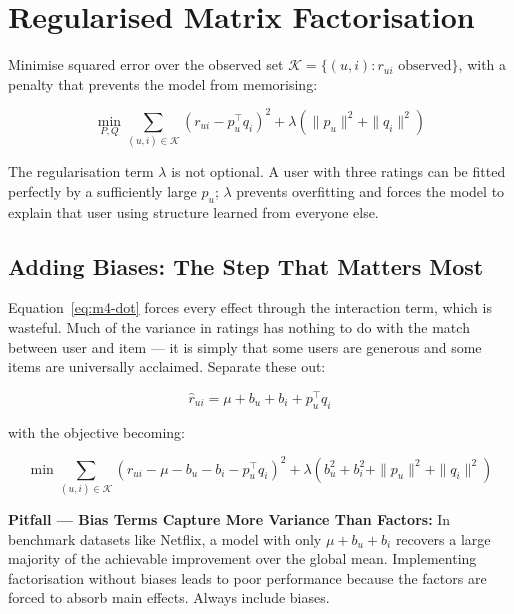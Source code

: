 \documentclass[12pt,a4paper]{article}
\begin{document}
\section{Regularised Matrix Factorisation}

Minimise squared error over the observed set $\mathcal{K} = \{(u,i) : r_{ui} \text{ observed}\}$, with a penalty that prevents the model from memorising:

\begin{equation}
\min_{P,Q} \sum_{(u,i) \in \mathcal{K}}
  \left(r_{ui} - p_u^{\top} q_i\right)^2
  + \lambda\left(\|p_u\|^2 + \|q_i\|^2\right)
\label{eq:m4-objective}
\end{equation}

The regularisation term $\lambda$ is not optional. A user with three ratings can be fitted perfectly by a sufficiently large $p_u$; $\lambda$ prevents overfitting and forces the model to explain that user using structure learned from everyone else.

\subsection{Adding Biases: The Step That Matters Most}

Equation~\ref{eq:m4-dot} forces every effect through the interaction term, which is wasteful. Much of the variance in ratings has nothing to do with the match between user and item --- it is simply that some users are generous and some items are universally acclaimed. Separate these out:

\begin{equation}
\hat{r}_{ui} = \mu + b_u + b_i + p_u^{\top} q_i
\label{eq:m4-biased}
\end{equation}

with the objective becoming:

\begin{equation}
\min \sum_{(u,i) \in \mathcal{K}}
  \left(r_{ui} - \mu - b_u - b_i - p_u^{\top}q_i\right)^2
  + \lambda\left(b_u^2 + b_i^2 + \|p_u\|^2 + \|q_i\|^2\right)
\label{eq:m4-biased-obj}
\end{equation}

\begin{example}
\textbf{Pitfall --- Bias Terms Capture More Variance Than Factors:} In benchmark datasets like Netflix, a model with only $\mu + b_u + b_i$ recovers a large majority of the achievable improvement over the global mean. Implementing factorisation without biases leads to poor performance because the factors are forced to absorb main effects. Always include biases.
\end{example}
\end{document}

